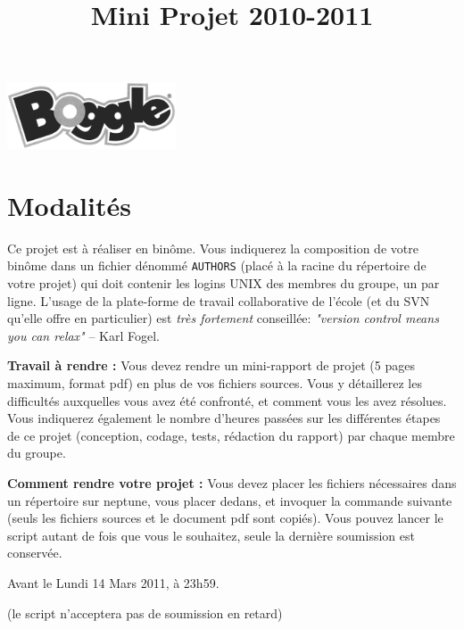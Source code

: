 \documentclass[10pt]{article}
\begin{document}
\color{black}
\title{Mini Projet 2010-2011}
\maketitle

\vspace{-1cm}
\begin{center}
\includegraphics[width=5cm]{boggle.png}
\end{center}

\section*{Modalités}

Ce projet est à réaliser en binôme. Vous indiquerez la composition de
votre binôme dans un fichier dénommé \texttt{AUTHORS} (placé  à la
racine du répertoire de votre projet) qui doit contenir les logins
UNIX des membres du groupe, un par ligne. L'usage de la plate-forme de
travail collaborative de l'école (et du SVN qu'elle offre en
particulier) est \textit{très fortement} conseillée: \textit{"version control
  means you can relax"} -- Karl Fogel. 


{\bf Travail à rendre :} Vous devez rendre un mini-rapport de projet (5 pages
maximum, format pdf) en plus de vos fichiers sources.  Vous y détaillerez les
difficultés auxquelles vous avez été confronté, et comment vous les avez
résolues. Vous indiquerez également le nombre d'heures passées sur les
différentes étapes de ce projet (conception, codage, tests, rédaction du
rapport) par chaque membre du groupe.

{\bf Comment rendre votre projet :} Vous devez placer les fichiers nécessaires
dans un répertoire sur neptune, vous placer dedans, et invoquer la commande
suivante (seuls les fichiers sources et le document pdf sont copiés). Vous pouvez
lancer le script autant de fois que vous le souhaitez, seule la dernière
soumission est conservée.
\begin{center}

{\Large Avant le Lundi 14 Mars 2011, à 23h59.} 

(le script n'acceptera pas de soumission en retard)
\end{center}
\end{document}
